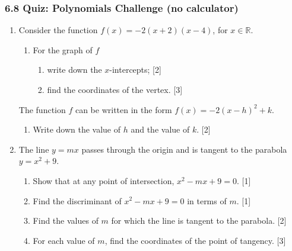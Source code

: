 \documentclass[12pt, twoside]{article}
\begin{document}
\subsubsection*{6.8 Quiz: Polynomials Challenge (no calculator)}

\begin{enumerate}[itemsep=0.15cm]

\item[1.] [Maximum mark: 7]

Consider the function $f(x) = -2(x + 2)(x - 4)$, for $x \in \mathbb{R}$.

\begin{enumerate}[itemsep=0.15cm]
  \item For the graph of $f$
  \begin{enumerate}[itemsep=0.1cm]
    \item[(i)] write down the $x$-intercepts; \hfill [2]
    \item[(ii)] find the coordinates of the vertex. \hfill [3]
  \end{enumerate}
\end{enumerate}

The function $f$ can be written in the form $f(x) = -2(x - h)^2 + k$.

\begin{enumerate}[itemsep=0.15cm]
  \item[(b)] Write down the value of $h$ and the value of $k$. \hfill [2]
\end{enumerate}


\newpage

\item[2.] [Maximum mark: 7]

The line $y = mx$ passes through the origin and is tangent
to the parabola $y = x^2 + 9$.

\begin{enumerate}[itemsep=0.15cm]
  \item Show that at any point of intersection,
  $x^2 - mx + 9 = 0$. \hfill [1]
  \item Find the discriminant of $x^2 - mx + 9 = 0$
  in terms of $m$. \hfill [1]
  \item Find the values of $m$ for which the line is tangent
  to the parabola. \hfill [2]
  \item For each value of $m$, find the coordinates of
  the point of tangency. \hfill [3]
\end{enumerate}


\end{enumerate}
\end{document}
